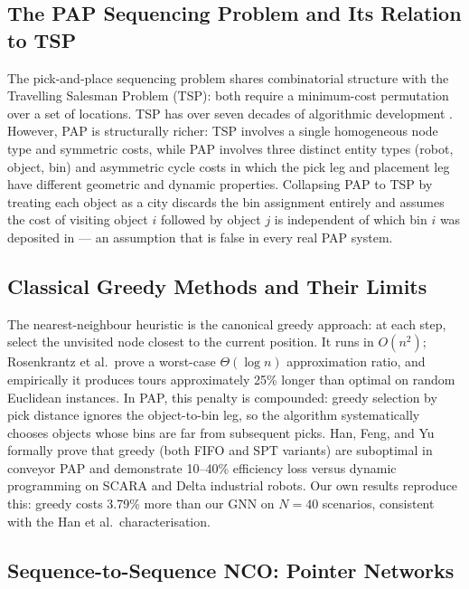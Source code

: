\documentclass[conference]{IEEEtran}
\begin{document}
\subsection{The PAP Sequencing Problem and Its Relation to TSP}

The pick-and-place sequencing problem shares combinatorial structure with the Travelling Salesman Problem (TSP): both require a minimum-cost permutation over a set of locations. TSP has over seven decades of algorithmic development \cite{dantzig1954}. However, PAP is structurally richer: TSP involves a single homogeneous node type and symmetric costs, while PAP involves three distinct entity types (robot, object, bin) and asymmetric cycle costs in which the pick leg and placement leg have different geometric and dynamic properties. Collapsing PAP to TSP by treating each object as a city discards the bin assignment entirely and assumes the cost of visiting object $i$ followed by object $j$ is independent of which bin $i$ was deposited in --- an assumption that is false in every real PAP system.

\subsection{Classical Greedy Methods and Their Limits}

The nearest-neighbour heuristic \cite{rosenkrantz1977} is the canonical greedy approach: at each step, select the unvisited node closest to the current position. It runs in $O(n^2)$; Rosenkrantz et al.\ prove a worst-case $\Theta(\log n)$ approximation ratio, and empirically it produces tours approximately 25\% longer than optimal on random Euclidean instances. In PAP, this penalty is compounded: greedy selection by pick distance ignores the object-to-bin leg, so the algorithm systematically chooses objects whose bins are far from subsequent picks. Han, Feng, and Yu \cite{han2019pap} formally prove that greedy (both FIFO and SPT variants) are suboptimal in conveyor PAP and demonstrate 10--40\% efficiency loss versus dynamic programming on SCARA and Delta industrial robots. Our own results reproduce this: greedy costs 3.79\% more than our GNN on $N{=}40$ scenarios, consistent with the Han et al.\ characterisation.

\subsection{Sequence-to-Sequence NCO: Pointer Networks}
\end{document}
